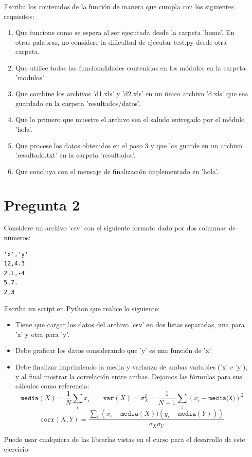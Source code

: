 \documentclass{article}
\begin{document}
    Escriba los contenidos de la función de manera que cumpla con los siguientes requisitos: 
    \begin{enumerate}
        \item Que funcione como se espera al ser ejecutada desde la carpeta 'home'. En otras palabras, no considere la dificultad de ejecutar test.py desde otra carpeta.
        \item Que utilice todas las funcionalidades contenidas en los módulos en la carpeta 'modulos'.
        \item Que combine los archivos 'd1.xls' y 'd2.xls' en un único archivo 'd.xls' que sea guardado en la carpeta 'resultados/datos'.
        \item Que lo primero que muestre el archivo sea el saludo entregado por el módulo 'hola'.
        \item Que procese los datos obtenidos en el paso 3 y que los guarde en un archivo 'resultado.txt' en la carpeta 'resultados'.
        \item Que concluya con el mensaje de finalización implementado en 'hola'.
    \end{enumerate}
\section*{Pregunta 2}
Considere un archivo 'csv' con el siguiente formato dado por dos columnas de números:
    \begin{verbatim}
'x','y'
12,4.3
2.1,-4
5,7.
2,3
    \end{verbatim}
Escriba un script en Python que realice lo siguiente:
    \begin{itemize}
        \item Tiene que cargar los datos del archivo 'csv' en dos listas separadas, una para 'x' y otra para 'y'.
        \item Debe graficar los datos considerando que 'y' es una función de 'x'.
        \item Debe finalizar imprimiendo la media y varianza de ambas variables ('x' e 'y'), y al final mostrar la correlación entre ambas. Dejamos las fórmulas para sus cálculos como referencia: 
            $$ \texttt{media}(X) = \frac 1 N \sum_i x_i \qquad \texttt{var}(X) = \sigma_X^2 = \frac{1}{N-1}\sum_i(x_i-\texttt{media(X)})^2$$
            $$\texttt{corr}(X,Y) = \frac{\sum_i\left(x_i - \texttt{media}(X))(y_i - \texttt{media}(Y))\right)}{\sigma_X\sigma_Y} $$
    \end{itemize}
Puede usar cualquiera de las librerías vistas en el curso para el desarrollo de este ejercicio.
\end{document}
